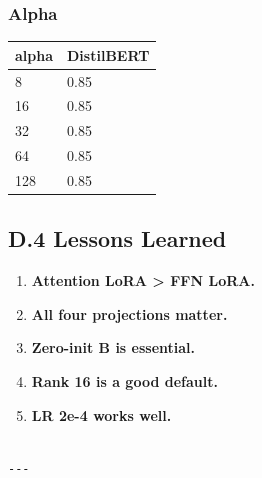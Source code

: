 \subsubsection{Alpha}

\begin{table}[H]
\centering
\small
\begin{tabular}{ll}
\toprule
\textbf{alpha} & \textbf{DistilBERT} \\
\midrule
8 & 0.85 \\
16 & 0.85 \\
32 & 0.85 \\
64 & 0.85 \\
128 & 0.85 \\
\bottomrule
\end{tabular}
\end{table}

\subsection{D.4 Lessons Learned}

\begin{enumerate}
\item \textbf{Attention LoRA > FFN LoRA.}
\item \textbf{All four projections matter.}
\item \textbf{Zero-init B is essential.}
\item \textbf{Rank 16 is a good default.}
\item \textbf{LR 2e-4 works well.}
\end{enumerate}
\begin{lstlisting}

---
\end{lstlisting}